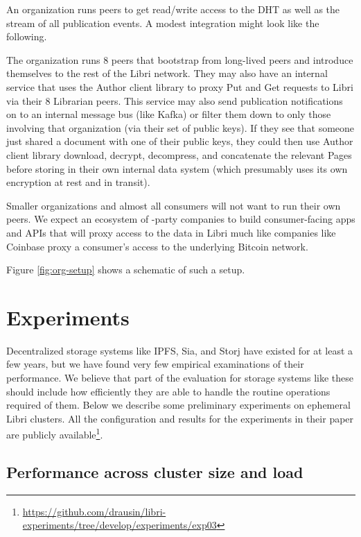 \documentclass[10pt]{article}
\begin{document}
An organization runs peers to get read/write access to the DHT as well as the stream of all publication events. A modest integration might look like the following.

The organization runs 8 peers that bootstrap from long-lived peers and introduce themselves to the rest of the Libri network. They may also have an internal service that uses the Author client library to proxy Put and Get requests to Libri via their 8 Librarian peers. This service may also send publication notifications on to an internal message bus (like Kafka) or filter them down to only those involving that organization (via their set of public keys). If they see that someone just shared a document with one of their public keys, they could then use Author client library download, decrypt, decompress, and concatenate the relevant Pages before storing in their own internal data system (which presumably uses its own encryption at rest and in transit).

Smaller organizations and almost all consumers will not want to run their own peers. We expect an ecosystem of -party companies to build consumer-facing apps and APIs that will proxy access to the data in Libri much like companies like Coinbase proxy a consumer's access to the underlying Bitcoin network.

Figure \ref{fig:org-setup} shows a schematic of such a setup.
\section{Experiments}
\label{sec:exps}
Decentralized storage systems like IPFS, Sia, and Storj have existed for at least a few years, but we have found very few empirical examinations of their performance. We believe that part of the evaluation for storage systems like these should include how efficiently they are able to handle the routine operations required of them. Below we describe some preliminary experiments on ephemeral Libri clusters. All the configuration and results for the experiments in their paper are publicly available\footnote{\url{https://github.com/drausin/libri-experiments/tree/develop/experiments/exp03}}.

\subsection{Performance across cluster size and load}
\end{document}
